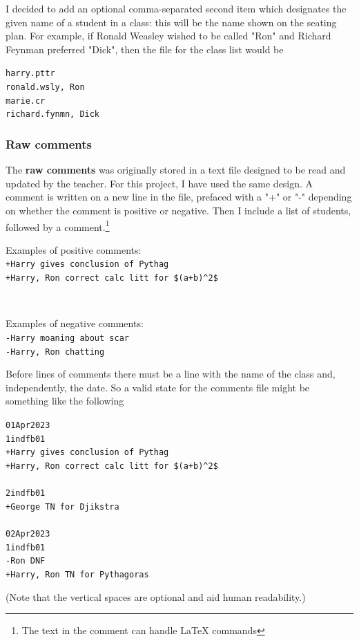 \documentclass[10pt]{article}
\begin{document}
I decided to add an optional comma-separated second item which designates the given name of a student in a class: this will be the name shown on the seating plan. For example, if Ronald Weasley wished to be called "Ron" and Richard Feynman preferred "Dick", then the file for the class list would be 
\begin{tcolorbox}[title = 1in1dfb01.txt]
\texttt{harry.pttr\\ronald.wsly, Ron\\marie.cr\\richard.fynmn, Dick}
\end{tcolorbox}

\subsubsection{Raw comments}
The \textbf{raw comments} was originally stored in a text file designed to be read and updated by the teacher. For this project, I have used the same design. A comment is written on a new line in the file, prefaced with a "+" or "-" depending on whether the comment is positive or negative. Then I include a list of students, followed by a comment.\footnote{The text in the comment can handle \LaTeX{} commands}

Examples of positive comments: \\
\texttt{+Harry gives conclusion of Pythag} \\
\texttt{+Harry, Ron correct calc litt for \$(a+b)\textasciicircum2\$}

\

Examples of negative comments: \\
\texttt{-Harry moaning about scar} \\
\texttt{-Harry, Ron chatting}

Before lines of comments there must be a line with the name of the class and, independently, the date. So a valid state for the comments file might be something like the following
\begin{tcolorbox}[title = comments\_file\_v0.1.txt]
\texttt{01Apr2023\\1indfb01\\+Harry gives conclusion of Pythag\\+Harry, Ron correct calc litt for \$(a+b)\textasciicircum2\$\\\\2indfb01\\+George TN for Djikstra \\\\02Apr2023\\1indfb01\\-Ron DNF\\+Harry, Ron TN for Pythagoras}
\end{tcolorbox}
(Note that the vertical spaces are optional and aid human readability.)
\end{document}
